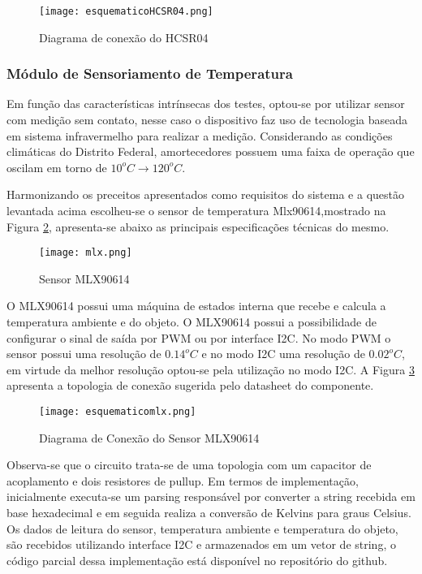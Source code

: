 		\begin{figure}[!h]
			\centering
			\texttt{[image: esquematicoHCSR04.png]}
			\caption{Diagrama de conexão do HCSR04}
			\label{esquematicoHCSR04}
		\end{figure}


	\subsubsection{Módulo de Sensoriamento de Temperatura}

		Em função das características intrínsecas dos testes, optou-se por utilizar sensor com medição sem contato, nesse caso o dispositivo faz uso de tecnologia baseada em sistema infravermelho para realizar a medição. Considerando as condições climáticas do Distrito Federal, amortecedores possuem uma faixa de operação que oscilam em torno de $10^oC \rightarrow 120^oC$. 

		Harmonizando os preceitos apresentados como requisitos do sistema e a questão levantada acima escolheu-se o sensor de temperatura Mlx90614,mostrado na Figura \ref{mlx}, apresenta-se abaixo as principais especificações técnicas do mesmo.

		\begin{figure}[!h]
			\centering
			\texttt{[image: mlx.png]}
			\caption{Sensor MLX90614}
			\label{mlx}
		\end{figure}

		O MLX90614 possui uma máquina de estados interna que recebe e calcula a temperatura ambiente e do objeto. O MLX90614 possui a possibilidade de configurar o sinal de saída por PWM ou por interface I2C. No modo PWM o sensor possui uma resolução de $0.14^oC$ e no modo I2C uma resolução de $0.02^oC$, em virtude da melhor resolução optou-se pela utilização no modo I2C. A Figura \ref{esquematicomlx} apresenta a topologia de conexão sugerida pelo datasheet do componente. 

		\begin{figure}[!h]
			\centering
			\texttt{[image: esquematicomlx.png]}
			\caption{Diagrama de Conexão do Sensor MLX90614}
			\label{esquematicomlx}
		\end{figure}

		Observa-se que o circuito trata-se de uma topologia com um capacitor de acoplamento e dois resistores de pullup. Em termos de implementação, inicialmente executa-se um parsing responsável por converter a string recebida em base hexadecimal e em seguida realiza a conversão de Kelvins para graus Celsius.
		Os dados de leitura do sensor, temperatura ambiente e temperatura do objeto, são recebidos utilizando interface I2C e armazenados em um vetor de string, o código parcial dessa implementação está disponível no repositório do github.


